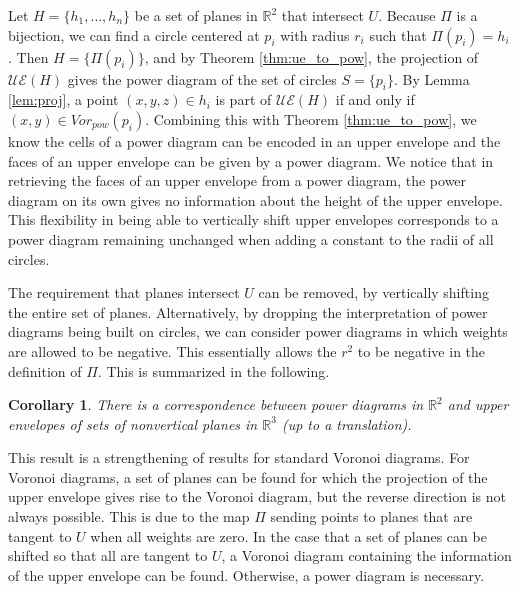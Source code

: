 \documentclass[a4paper, 11pt]{article}
\newtheorem{corollary}{Corollary}[section]
\newcommand{\R}{\mathbb{R}}
\begin{document}
Let $H = \{ h_1,\dots, h_n \}$ be a set of planes in $\R^2$ that intersect $U$. Because $\Pi$ is a bijection, we can find a circle centered at $p_i$
with radius $r_i$ such that $\Pi( p_i ) = h_i$. Then $H = \{ \Pi(p_i) \}$, and by Theorem \ref{thm:ue_to_pow}, the projection of $\mathcal{UE}(H)$ gives the
power diagram of the set of circles $S = \{ p_i \}$. By Lemma \ref{lem:proj}, a point $(x,y,z) \in h_i$ is part of $\mathcal{UE}(H)$ if and only if $(x,y) \in
Vor_{pow}(p_i)$. Combining this with Theorem \ref{thm:ue_to_pow}, we know the cells of a power diagram can be encoded in an upper envelope and the
faces of an upper envelope can be given by a power diagram. We notice that in retrieving the faces of an upper envelope from a power diagram, the
power diagram on its own gives no information about the height of the upper envelope. This flexibility in being able to vertically shift upper
envelopes corresponds to a power diagram remaining unchanged when adding a constant to the radii of all circles.

The requirement that planes intersect $U$ can be removed, by vertically shifting the entire set of planes. Alternatively, by dropping the
interpretation of power diagrams being built on circles, we can consider power diagrams in which weights are allowed to be negative. This essentially
allows the $r^2$ to be negative in the definition of $\Pi$. This is summarized in the following.

\begin{corollary}
  There is a correspondence between power diagrams in $\R^2$ and upper envelopes of sets of nonvertical planes in $\R^3$ (up to a translation).
  \label{cor:ue_pow}
\end{corollary}

This result is a strengthening of results for standard Voronoi diagrams. For Voronoi diagrams, a set of planes can be found for which the projection
of the upper envelope gives rise to the Voronoi diagram, but the reverse direction is not always possible. This is due to the map $\Pi$ sending points
to planes that are tangent to $U$ when all weights are zero. In the case that a set of planes can be shifted so that all are tangent to $U$, a Voronoi diagram containing the
information of the upper envelope can be found. Otherwise, a power diagram is necessary.
\end{document}
